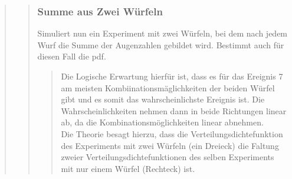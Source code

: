 \begin{quote}
\begin{quote}
\begin{quote}
        \end{quote}
        
        
        \subsubsection{Summe aus Zwei Würfeln}
        Simuliert nun ein Experiment mit zwei Würfeln, bei dem nach jedem Wurf die Summe der Augenzahlen gebildet wird. Bestimmt
        auch für diesen Fall die pdf.
        
        \begin{quote}
            
            Die Logische Erwartung hierfür ist, dass es für das Ereignis 7 am meisten Kombiinationsmäglichkeiten
            der beiden Würfel gibt und es somit das wahrscheinlichste Ereignis ist. Die Wahrscheinlichkeiten nehmen dann
            in beide Richtungen linear ab, da die Kombinationsmöglichkeiten linear abnehmen.\\
            Die Theorie besagt hierzu, dass die Verteilungsdichtefunktion des Experiments mit zwei Würfeln (ein
            Dreieck) die Faltung zweier Verteilungsdichtefunktionen des selben Experiments mit nur einem Würfel (Rechteck) ist.
            

\end{quote}
\end{quote}
\end{quote}
